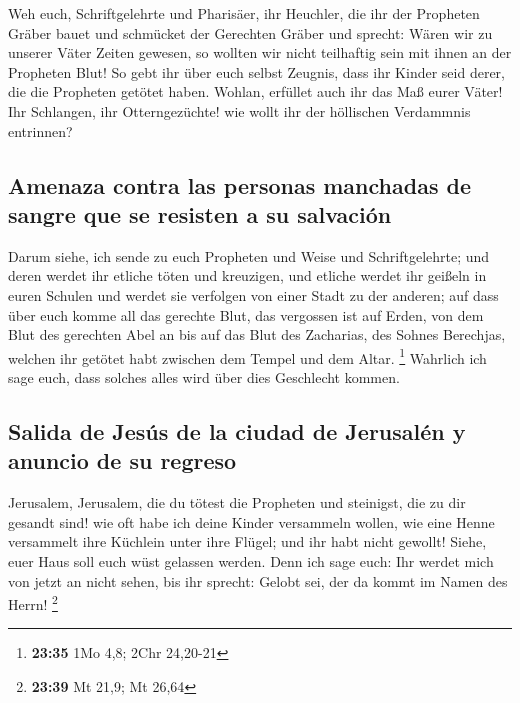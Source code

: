  Weh euch, Schriftgelehrte und Pharisäer, ihr Heuchler,
die ihr der Propheten Gräber bauet und schmücket der Gerechten Gräber
 und sprecht: Wären wir zu unserer Väter Zeiten gewesen,
so wollten wir nicht teilhaftig sein mit ihnen an der Propheten Blut!
 So gebt ihr über euch selbst Zeugnis, dass ihr Kinder
seid derer, die die Propheten getötet haben.  Wohlan,
erfüllet auch ihr das Maß eurer Väter!  Ihr Schlangen,
ihr Otterngezüchte! wie wollt ihr der höllischen Verdammnis entrinnen?

\hypertarget{amenaza-contra-las-personas-manchadas-de-sangre-que-se-resisten-a-su-salvaciuxf3n}{%
\subsection{Amenaza contra las personas manchadas de sangre que se
resisten a su
salvación}\label{amenaza-contra-las-personas-manchadas-de-sangre-que-se-resisten-a-su-salvaciuxf3n}}

 Darum siehe, ich sende zu euch Propheten und Weise und
Schriftgelehrte; und deren werdet ihr etliche töten und kreuzigen, und
etliche werdet ihr geißeln in euren Schulen und werdet sie verfolgen von
einer Stadt zu der anderen;  auf dass über euch komme all
das gerechte Blut, das vergossen ist auf Erden, von dem Blut des
gerechten Abel an bis auf das Blut des Zacharias, des Sohnes Berechjas,
welchen ihr getötet habt zwischen dem Tempel und dem Altar. \footnote{\textbf{23:35}
  1Mo 4,8; 2Chr 24,20-21}  Wahrlich ich sage euch, dass
solches alles wird über dies Geschlecht kommen.

\hypertarget{salida-de-jesuxfas-de-la-ciudad-de-jerusaluxe9n-y-anuncio-de-su-regreso}{%
\subsection{Salida de Jesús de la ciudad de Jerusalén y anuncio de su
regreso}\label{salida-de-jesuxfas-de-la-ciudad-de-jerusaluxe9n-y-anuncio-de-su-regreso}}

 Jerusalem, Jerusalem, die du tötest die Propheten und
steinigst, die zu dir gesandt sind! wie oft habe ich deine Kinder
versammeln wollen, wie eine Henne versammelt ihre Küchlein unter ihre
Flügel; und ihr habt nicht gewollt!  Siehe, euer Haus
soll euch wüst gelassen werden.  Denn ich sage euch: Ihr
werdet mich von jetzt an nicht sehen, bis ihr sprecht: Gelobt sei, der
da kommt im Namen des Herrn! \footnote{\textbf{23:39} Mt 21,9; Mt 26,64}

